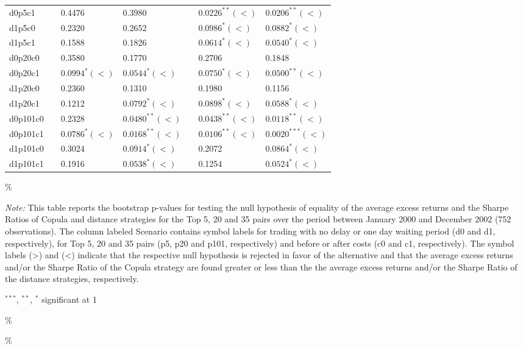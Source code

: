 \documentclass[a4paper]{article}
\begin{document}
\begin{threeparttable}[H]
\begin{tabularx}{\textwidth}{@{\extracolsep{\fill}}lllllll@{}}
		d0p5c1 & & 0.4476 & 0.3980 &       & $0.0226^{**}(<)$ & $0.0206^{**}(<)$ \\
		d1p5c0 & & 0.2320 & 0.2652 &       & $0.0986^{*}(<)$ & $0.0882^{*}(<)$ \\
		d1p5c1 & & 0.1588 & 0.1826 &       & $0.0614^{*}(<)$ & $0.0540^{*}(<)$ \\
		d0p20c0 & & 0.3580 & 0.1770 &       & 0.2706 & 0.1848 \\
		d0p20c1 & & $0.0994^{*}(<)$ & $0.0544^{*}(<)$ &       & $0.0750^{*}(<)$ & $0.0500^{**}(<)$ \\
		d1p20c0 & & 0.2360 & 0.1310 &       & 0.1980 & 0.1156 \\
		d1p20c1 & & 0.1212 & $0.0792^{*}(<)$ &       & $0.0898^{*}(<)$ & $0.0588^{*}(<)$ \\
		d0p101c0 & & 0.2328 & $0.0480^{**}(<)$ &       & $0.0438^{**}(<)$ & $0.0118^{**}(<)$ \\
		d0p101c1 & & $0.0786^{*}(<)$ & $0.0168^{**}(<)$ &       & $0.0106^{**}(<)$ & $0.0020^{***}(<)$ \\
		d1p101c0 & & 0.3024 & $0.0914^{*}(<)$ &       & 0.2072 & $0.0864^{*}(<)$ \\
		d1p101c1 & & 0.1916 & $0.0538^{*}(<)$ &       & 0.1254 & $0.0524^{*}(<)$ \\
		\bottomrule
	\end{tabularx}\%
	\begin{tablenotes}
		\item \textit{Note:} \scriptsize This table reports the bootstrap p-values for testing the null hypothesis of equality of the average excess returns and the Sharpe Ratios of Copula and distance strategies for the Top 5, 20 and 35 pairs over the period between January 2000 and December 2002 (752 observations). The column labeled Scenario contains symbol labels for trading with no delay or one day waiting period (d0 and d1, respectively), for Top 5, 20 and 35 pairs (p5, p20 and p101, respectively) and before or after costs (c0 and c1, respectively). The symbol labels (>) and (<) indicate that the respective null hypothesis is rejected in favor of the alternative and that the average excess returns and/or the Sharpe Ratio of the Copula strategy are found greater or less than the the average excess returns and/or the Sharpe Ratio of the distance strategies, respectively.
		\item \scriptsize $^{\ast\ast\ast}$, $^{\ast\ast}$, $^{\ast}$  significant at 1\\%
	\end{tablenotes}
	\label{tab:table122}\%
\end{threeparttable}\%
\end{document}
